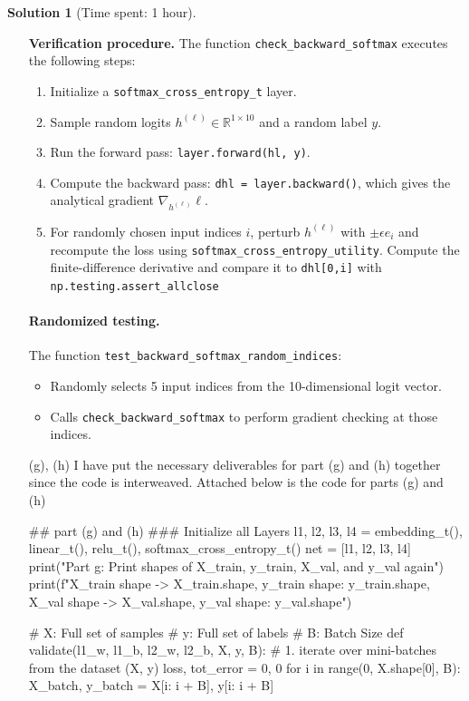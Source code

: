 \documentclass[11pt, reqno, letterpaper, twoside]{amsart}
\theoremstyle{plain}
\theoremstyle{definition}
\newtheorem{solution}[theorem]{Solution}
\begin{document}
\begin{solution}[Time spent: 1 hour]
\begin{enumerate}
\textbf{Verification procedure.}
The function \verb|check_backward_softmax| executes the following steps:
\begin{enumerate}
  \item Initialize a \verb|softmax_cross_entropy_t| layer.
  \item Sample random logits $h^{(\ell)} \in \mathbb{R}^{1 \times 10}$ and a random label $y$.
  \item Run the forward pass: \verb|layer.forward(hl, y)|.
  \item Compute the backward pass: \verb|dhl = layer.backward()|, which gives the analytical gradient $\nabla_{h^{(\ell)}} \ell$.
  \item For randomly chosen input indices $i$, perturb $h^{(\ell)}$ with $\pm \epsilon e_i$ and recompute the loss using \verb|softmax_cross_entropy_utility|.  
  Compute the finite-difference derivative and compare it to \verb|dhl[0,i]| with \verb|np.testing.assert_allclose|  
\end{enumerate}

\paragraph{Randomized testing.}
The function \verb|test_backward_softmax_random_indices|:
\begin{itemize}
  \item Randomly selects 5 input indices from the 10-dimensional logit vector.
  \item Calls \verb|check_backward_softmax| to perform gradient checking at those indices.
\end{itemize}

\item[(g), (h)]  I have put the necessary deliverables for part (g) and (h) together since the code is interweaved. Attached below is the code for parts (g) and (h)
\begin{python}
## part (g) and (h)
### Initialize all Layers
l1, l2, l3, l4 = embedding_t(), linear_t(), relu_t(), softmax_cross_entropy_t()
net = [l1, l2, l3, l4]
print("Part g: Print shapes of X_train, y_train, X_val, and y_val again")
print(f"X_train shape -> {X_train.shape}, y_train shape: {y_train.shape}, X_val shape -> {X_val.shape}, y_val shape: {y_val.shape}")

# X: Full set of samples
# y: Full set of labels
# B: Batch Size
def validate(l1_w, l1_b, l2_w, l2_b, X, y, B):
    # 1. iterate over mini-batches from the dataset (X, y)
    loss, tot_error = 0, 0
    for i in range(0, X.shape[0], B):
        X_batch, y_batch = X[i: i + B], y[i: i + B]


\end{python}
\end{enumerate}
\end{solution}
\end{document}
